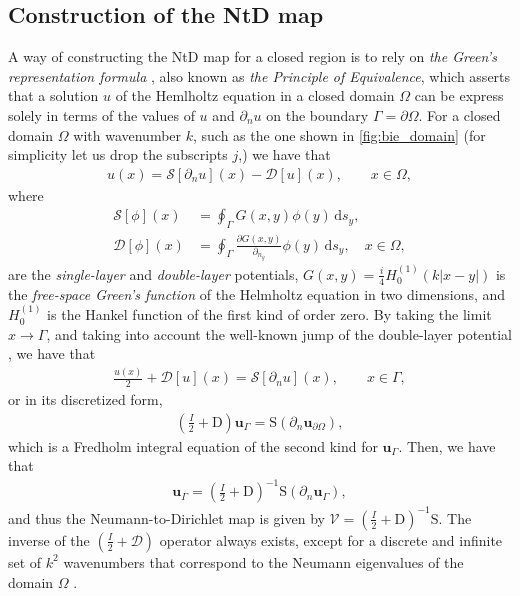 \documentclass[reprint,amsmath,amssymb,
 aps]{revtex4-2}
\newcommand{\bol}{\boldsymbol}
\newcommand{\de}{\,\mathrm{d}}
\newcommand{\Dcal}{\mathcal{D}}
\newcommand{\Scal}{\mathcal{S}}
\newcommand{\Vcal}{\mathcal{V}}
\newcommand{\abs}[1]{\left|#1\right|}
\begin{document}
\subsection{Construction of the NtD map}\label{sec:ntdmap}
A way of constructing the NtD map for a closed region is to rely on \textit{the Green's representation formula} \cite{colton2013integral}, also known as \textit{the Principle of Equivalence}, which asserts that a solution $u$ of the Hemlholtz equation in a closed domain $\Omega$ can be express solely in terms of the values of $u$ and $\partial_n u$ on the boundary $\Gamma = \partial\Omega$. For a closed domain $\Omega$ with wavenumber $k$, such as the one shown in \cref{fig:bie_domain} (for simplicity let us drop the subscripts $j$,) we have that 
\begin{align}
    u(x) = \Scal[\partial_n u](x) - \Dcal[u](x), \qquad x\in \Omega,
\end{align}
where 
\begin{align}
    \Scal[\phi](x) &= \oint_{\Gamma}G(x,y)\phi(y)\de s_y,\\
    \Dcal[\phi](x) &= \oint_{\Gamma}\frac{\partial G(x,y)}{\partial_{n_y}}\phi(y)\de s_y, \quad x\in \Omega,
\end{align}
are the \textit{single-layer} and \textit{double-layer} potentials, $G(x,y) = \tfrac{i}{4}H_0^{(1)}(k \abs{x-y})$ is the \textit{free-space Green's function} of the Helmholtz equation in two dimensions, and $H_0^{(1)}$ is the Hankel function of the first kind of order zero.
By taking the limit $x\rightarrow \Gamma$, and taking into account the well-known jump of the double-layer potential \cite{colton2013integral}, we have that
\begin{align}
    \frac{u(x)}{2}+\Dcal[u](x) = \Scal[\partial_n u](x), \qquad x\in \Gamma,
\end{align}
or in its discretized form,
\begin{align}
    \left(\frac{I}{2} + \mathrm{D}\right)\bol u_{\Gamma} = \mathrm{S}(\partial_n \bol u_{\partial\Omega}), \label{eq:bie_fredh}
\end{align}
which is a Fredholm integral equation of the second kind for $\bol u_{\Gamma}$. Then, we have that
\begin{align}
    \bol u_{\Gamma} = \left(\frac{I}{2} + \mathrm{D}\right)^{-1}\mathrm{S}(\partial_n \bol u_{\Gamma}),
\end{align}
and thus the Neumann-to-Dirichlet map is given by $\Vcal = \left(\tfrac{I}{2} + \mathrm{D}\right)^{-1}\mathrm{S}$. The inverse of the $\left(\tfrac{I}{2} + \Dcal\right)$ operator always exists, except for a discrete and infinite set of $k^2$ wavenumbers that correspond to the Neumann eigenvalues of the domain $\Omega$ \cite{colton2013integral}.
\end{document}
